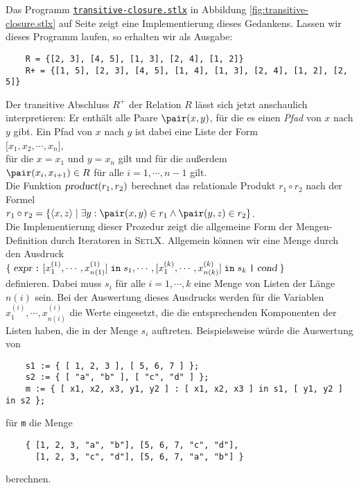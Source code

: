 \noindent
Das Programm 
\href{https://github.com/karlstroetmann/Logik/blob/master/SetlX/transitive-closure.stlx}{\texttt{transitive-closure.stlx}}
in Abbildung
\ref{fig:transitive-closure.stlx} auf Seite \pageref{fig:transitive-closure.stlx}  zeigt
eine Implementierung dieses Gedankens.
Lassen wir dieses Programm laufen, so erhalten wir als Ausgabe:
\begin{verbatim}
    R = {[2, 3], [4, 5], [1, 3], [2, 4], [1, 2]}
    R+ = {[1, 5], [2, 3], [4, 5], [1, 4], [1, 3], [2, 4], [1, 2], [2, 5]}
\end{verbatim}
Der transitive Abschluss $R^+$ der Relation $R$ lässt sich jetzt anschaulich
interpretieren:  Er enthält alle Paare $\pair(x,y)$, für die es einen \emph{Pfad} von
$x$ nach $y$ gibt.  Ein Pfad von $x$ nach $y$ ist dabei eine Liste der
Form \\[0.2cm]
\hspace*{1.3cm} $\bigl[ x_1, x_2, \cdots, x_n \bigr]$,
\\[0.2cm]
für die $x = x_1$ und $y = x_n$ gilt und für die außerdem 
\\[0.2cm]
\hspace*{1.3cm}
$\pair(x_i, x_{i+1}) \in R$ \quad für alle $i = 1, \cdots, n-1$ gilt.
\\[0.2cm]
Die Funktion $\textsl{product}(r_1, r_2)$ berechnet das relationale Produkt $r_1 \circ
r_2$ nach der Formel
\\[0.2cm]
\hspace*{1.3cm}
$r_1 \circ r_2 = \{ \langle x, z \rangle \mid \exists y: \pair(x,y) \in r_1 \wedge \pair(y,z) \in r_2 \}$.
\\[0.2cm]
Die Implementierung dieser Prozedur  zeigt die allgemeine
Form der Mengen-Defi\-nition durch Iteratoren in \textsc{SetlX}.  Allgemein können wir eine Menge
durch den Ausdruck
\\[0.2cm]
\hspace*{1.3cm}
$\{\; \textsl{expr} \;\texttt{:}\; [x^{(1)}_1, \cdots, x^{(1)}_{n(1)}] \;\texttt{in}\; s_1,
     \cdots, [x^{(k)}_1, \cdots, x^{(k)}_{n(k)}] \;\texttt{in}\; s_k \;\texttt{|}\;
     \textsl{cond} \;\}
$
\\[0.2cm]
definieren.  Dabei muss $s_i$ für alle $i=1, \cdots, k$ eine Menge von Listen  der Länge
$n(i)$ sein.  Bei der Auswertung dieses Ausdrucks werden für die Variablen 
$x^{(i)}_1, \cdots, x^{(i)}_{n(i)}$ die Werte eingesetzt, die die entsprechenden
Komponenten der Listen haben, die in der Menge $s_i$ auftreten.  Beispielsweise würde die
Auswertung von 
\begin{verbatim}
    s1 := { [ 1, 2, 3 ], [ 5, 6, 7 ] };
    s2 := { [ "a", "b" ], [ "c", "d" ] };
    m := { [ x1, x2, x3, y1, y2 ] : [ x1, x2, x3 ] in s1, [ y1, y2 ] in s2 };
\end{verbatim}
für \texttt{m} die Menge
\begin{verbatim}
    { [1, 2, 3, "a", "b"], [5, 6, 7, "c", "d"],  
      [1, 2, 3, "c", "d"], [5, 6, 7, "a", "b"] }
\end{verbatim}
berechnen. 


